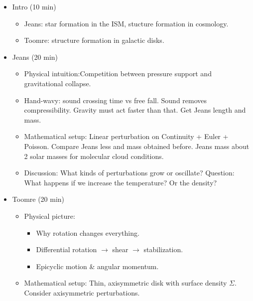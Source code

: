 \begin{itemize}
\item Intro (10 min)

  \begin{itemize}
    \item Jeans: star formation in the ISM, stucture formation in cosmology.
    \item Toomre: structure formation in galactic disks.
  \end{itemize}
  
\item Jeans (20 min)

  \begin{itemize}
  \item Physical intuition:Competition between pressure support and
    gravitational collapse.
    \item Hand-wavy: sound crossing time vs free fall. Sound removes
      compressibility. Gravity must act faster than that. Get Jeans
      length and mass.
    
    \item Mathematical setup: Linear perturbation on Continuity +
      Euler + Poisson. Compare Jeans less and mass obtained
      before. Jeans mass about 2 solar masses for molecular cloud conditions.

      \item Discussion: What kinds of perturbations grow or oscillate?
        Question: What happens if we increase the temperature? Or the density?
      
  \end{itemize}
  
\item Toomre (20 min)

  \begin{itemize}
    \item Physical picture:

        \begin{itemize}
        \item Why rotation changes everything.

        \item Differential rotation $\rightarrow$ shear $\rightarrow$ stabilization.

        \item Epicyclic motion \& angular momentum.
    \end{itemize}
    \item     Mathematical setup: Thin, axisymmetric disk with surface
      density $\Sigma$. Consider axisymmetric perturbations.


\end{itemize}
\end{itemize}
